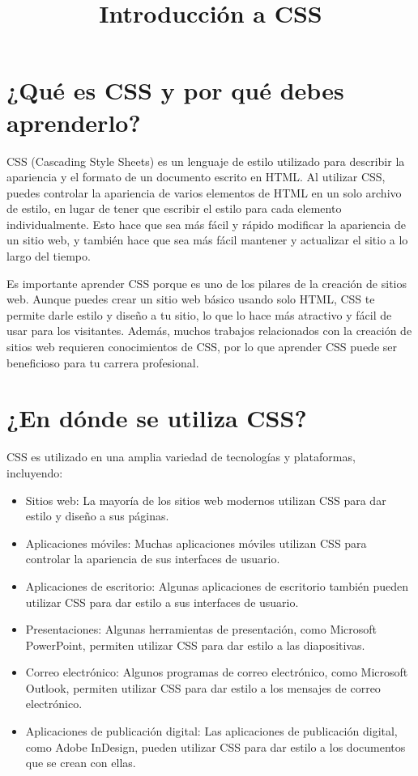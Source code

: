 \documentclass{article}
\title{Introducción a CSS}
\author{}
\date{}
\begin{document}
\maketitle

\section{¿Qué es CSS y por qué debes aprenderlo?}
CSS (Cascading Style Sheets) es un lenguaje de estilo utilizado para describir la apariencia y el formato de un documento escrito en HTML. Al utilizar CSS, puedes controlar la apariencia de varios elementos de HTML en un solo archivo de estilo, en lugar de tener que escribir el estilo para cada elemento individualmente. Esto hace que sea más fácil y rápido modificar la apariencia de un sitio web, y también hace que sea más fácil mantener y actualizar el sitio a lo largo del tiempo.

Es importante aprender CSS porque es uno de los pilares de la creación de sitios web. Aunque puedes crear un sitio web básico usando solo HTML, CSS te permite darle estilo y diseño a tu sitio, lo que lo hace más atractivo y fácil de usar para los visitantes. Además, muchos trabajos relacionados con la creación de sitios web requieren conocimientos de CSS, por lo que aprender CSS puede ser beneficioso para tu carrera profesional.

\section{¿En dónde se utiliza CSS?}
CSS es utilizado en una amplia variedad de tecnologías y plataformas, incluyendo:
\begin{itemize}
	\item Sitios web: La mayoría de los sitios web modernos utilizan CSS para dar estilo y diseño a sus páginas.
	\item Aplicaciones móviles: Muchas aplicaciones móviles utilizan CSS para controlar la apariencia de sus interfaces de usuario.
	\item Aplicaciones de escritorio: Algunas aplicaciones de escritorio también pueden utilizar CSS para dar estilo a sus interfaces de usuario.
	\item Presentaciones: Algunas herramientas de presentación, como Microsoft PowerPoint, permiten utilizar CSS para dar estilo a las diapositivas.
	\item Correo electrónico: Algunos programas de correo electrónico, como Microsoft Outlook, permiten utilizar CSS para dar estilo a los mensajes de correo electrónico.
	\item Aplicaciones de publicación digital: Las aplicaciones de publicación digital, como Adobe InDesign, pueden utilizar CSS para dar estilo a los documentos que se crean con ellas.
\end{itemize}
\end{document}
